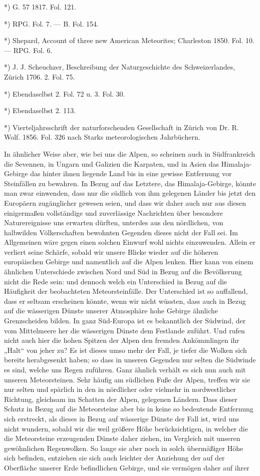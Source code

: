 \documentclass[a4paper, 11pt, oneside, polutonikogreek, german]{article}
\begin{document}
*) G. 57 1817. Fol. 121.

*) RPG. Fol. 7. — B. Fol. 154.

*) Shepard, Account of three new American Meteorites; Charleston 1850. Fol. 10. — RPG. Fol. 6.

*) J. J. Scheuchzer, Beschreibung der Naturgeschichte des Schweizerlandes, Zürich 1706. 2. Fol. 75.

*) Ebendaselbst 2. Fol. 72 u. 3. Fol. 30.

*) Ebendaselbst 2. 113.

*) Vierteljahrsschrift der naturforschenden Gesellschaft in Zürich von Dr. R. Wolf. 1856. Fol. 326 nach Starks meteorologischen Jahrbüchern.

In ähnlicher Weise aber, wie bei uns die Alpen, so scheinen auch in Südfrankreich die Sevennen, in Ungarn und Galizien die Karpaten, und in Asien das Himalaja-Gebirge das hinter ihnen liegende Land bis in eine gewisse Entfernung vor Steinfällen zu bewahren. In Bezug auf das Letztere, das Himalaja-Gebirge, könnte man zwar einwenden, dass nur die südlich von ihm gelegenen Länder bis jetzt den Europäern zugänglicher gewesen seien, und dass wir daher auch nur aus diesen einigermaßen vollständige und zuverlässige Nachrichten über besondere Naturereignisse uns erwarten dürften, unterdes aus den nördlichen, von halbwilden Völkerschaften bewohnten Gegenden dieses nicht der Fall sei. Im Allgemeinen wäre gegen einen solchen Einwurf wohl nichts einzuwenden. Allein er verliert seine Schärfe, sobald wir unsere Blicke wieder auf die höheren europäischen Gebirge und namentlich auf die Alpen lenken. Hier kann von einem ähnlichen Unterschiede zwischen Nord und Süd in Bezug auf die Bevölkerung nicht die Rede sein: und dennoch welch ein Unterschied in Bezug auf die Häufigkeit der beobachteten Meteorsteinfälle. Der Unterschied ist so auffallend, dass er seltsam erscheinen könnte, wenn wir nicht wüssten, dass auch in Bezug auf die wässerigen Dünste unserer Atmosphäre hohe Gebirge ähnliche Grenzscheiden bilden. In ganz Süd-Europa ist es bekanntlich der Südwind, der vom Mittelmeere her die wässerigen Dünste dem Festlande zuführt. Und rufen nicht auch hier die hohen Spitzen der Alpen den fremden Ankömmlingen ihr „Halt“ von jeher zu? Es ist dieses umso mehr der Fall, je tiefer die Wolken sich bereits herabgesenkt haben; so dass in unseren Gegenden nur selten die Südwinde es sind, welche uns Regen zuführen. Ganz ähnlich verhält es sich nun auch mit unseren Meteorsteinen. Sehr häufig am südlichen Fuße der Alpen, treffen wir sie nur selten und spärlich in den in nördlicher oder vielmehr in nordwestlicher Richtung, gleichsam im Schatten der Alpen, gelegenen Ländern. Dass dieser Schutz in Bezug auf die Meteorsteine aber bis in keine so bedeutende Entfernung sich erstreckt, als dieses in Bezug auf wässerige Dünste der Fall ist, wird uns nicht wundern, sobald wir die weil größere Höhe berücksichtigen, in welcher die die Meteorsteine erzeugenden Dünste daher ziehen, im Vergleich mit unseren gewöhnlichen Regenwolken. So lange sie aber noch in solch übermäßiger Höhe sich befinden, entziehen sie sich auch leichter der Anziehung der auf der Oberfläche unserer Erde befindlichen Gebirge, und sie vermögen daher auf ihrer 
\end{document}
